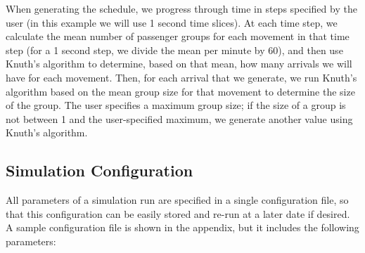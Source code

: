 \documentclass{UoYCSproject}
\begin{document}
When generating the schedule, we progress through time in steps specified by the user (in this example we will use 1 second time slices).  At each time step, we calculate the mean number of passenger groups for each movement in that time step (for a 1 second step, we divide the mean per minute by 60), and then use Knuth's algorithm to determine, based on that mean, how many arrivals we will have for each movement.  Then, for each arrival that we generate, we run Knuth's algorithm based on the mean group size for that movement to determine the size of the group.  The user specifies a maximum group size; if the size of a group is not between 1 and the user-specified maximum, we generate another value using Knuth's algorithm.

\subsection{Simulation Configuration}
All parameters of a simulation run are specified in a single configuration file, so that this configuration can be easily stored and re-run at a later date if desired.  A sample configuration file is shown in the appendix, but it includes the following parameters:
\end{document}
